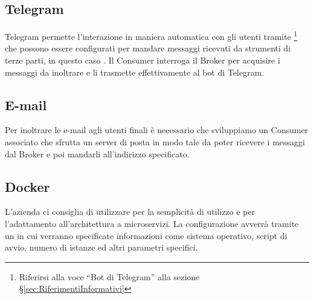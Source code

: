 		\subsection{Telegram}
		Telegram permette l'interazione in maniera automatica con gli utenti tramite \footnote{Riferirsi alla voce ``Bot di Telegram'' alla sezione \S\ref{sec:RiferimentiInformativi}} che possono essere configurati per mandare messaggi ricevuti da strumenti di terze parti, in questo caso \progetto.
		Il Consumer interroga il Broker per acquisire i messaggi da inoltrare e li trasmette effettivamente al bot di Telegram.
		
		\subsection{E-mail}
		Per inoltrare le e-mail agli utenti finali è necessario che sviluppiamo un Consumer associato che sfrutta un server di posta in modo tale da poter ricevere i messaggi dal Broker e poi mandarli all'indirizzo specificato.
		
		\subsection{Docker}
		L'azienda ci consiglia di utilizzare  per la semplicità di utilizzo e per l'adattamento all'architettura a microservizi.
		La configurazione avverrà tramite un  in cui verranno specificate informazioni come sistema operativo, script di avvio, numero di istanze ed altri parametri specifici.
			